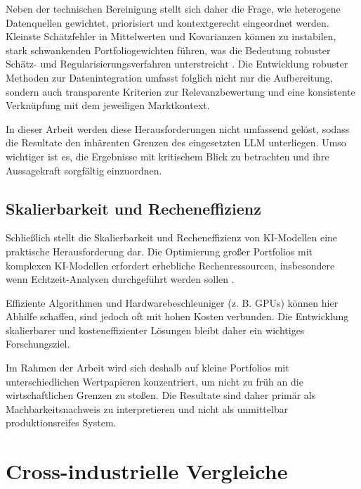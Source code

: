    Neben der technischen Bereinigung stellt sich daher die Frage, wie heterogene Datenquellen gewichtet, priorisiert und kontextgerecht eingeordnet werden.
    Kleinste Schätzfehler in Mittelwerten und Kovarianzen können zu instabilen, stark schwankenden Portfoliogewichten führen, was die Bedeutung robuster Schätz- und Regularisierungsverfahren unterstreicht \autocite[S. 1917–1919]{demiguel2009}.
    Die Entwicklung robuster Methoden zur Datenintegration umfasst folglich nicht nur die Aufbereitung, sondern auch transparente Kriterien zur Relevanzbewertung und eine konsistente Verknüpfung mit dem jeweiligen Marktkontext.

    In dieser Arbeit werden diese Herausforderungen nicht umfassend gelöst, sodass die Resultate den inhärenten Grenzen des eingesetzten \acs{LLM} unterliegen.
    Umso wichtiger ist es, die Ergebnisse mit kritischem Blick zu betrachten und ihre Aussagekraft sorgfältig einzuordnen.

  \subsection{Skalierbarkeit und Recheneffizienz}

    Schließlich stellt die Skalierbarkeit und Recheneffizienz von \acs{KI}-Modellen eine praktische Herausforderung dar.
    Die Optimierung großer Portfolios mit komplexen \acs{KI}-Modellen erfordert erhebliche Rechenressourcen, insbesondere wenn Echtzeit-Analysen durchgeführt werden sollen \autocite{ban2018}.

    Effiziente Algorithmen und Hardwarebeschleuniger (z. B. GPUs) können hier Abhilfe schaffen, sind jedoch oft mit hohen Kosten verbunden.
    Die Entwicklung skalierbarer und kosteneffizienter Lösungen bleibt daher ein wichtiges Forschungsziel.

    Im Rahmen der Arbeit wird sich deshalb auf kleine Portfolios mit unterschiedlichen Wertpapieren konzentriert, um nicht zu früh an die wirtschaftlichen Grenzen zu stoßen.
    Die Resultate sind daher primär als Machbarkeitsnachweis zu interpretieren und nicht als unmittelbar produktionsreifes System.


\section{Cross-industrielle Vergleiche}



